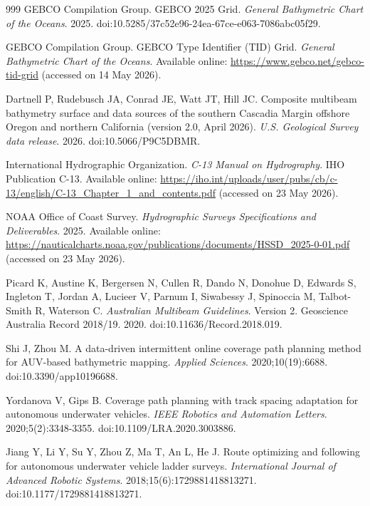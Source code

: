 \documentclass[jmse,article,submit,moreauthors]{Definitions/mdpi}
\begin{document}
\sloppy
\begin{thebibliography}{999}
GEBCO Compilation Group. GEBCO 2025 Grid. \textit{General Bathymetric Chart of the Oceans}. 2025. doi:10.5285/37c52e96-24ea-67ce-e063-7086abc05f29.

GEBCO Compilation Group. GEBCO Type Identifier (TID) Grid. \textit{General Bathymetric Chart of the Oceans}. Available online: \url{https://www.gebco.net/gebco-tid-grid} (accessed on 14 May 2026).

Dartnell P, Rudebusch JA, Conrad JE, Watt JT, Hill JC. Composite multibeam bathymetry surface and data sources of the southern Cascadia Margin offshore Oregon and northern California (version 2.0, April 2026). \textit{U.S. Geological Survey data release}. 2026. doi:10.5066/P9C5DBMR.

International Hydrographic Organization. \textit{C-13 Manual on Hydrography}. IHO Publication C-13. Available online: \url{https://iho.int/uploads/user/pubs/cb/c-13/english/C-13_Chapter_1_and_contents.pdf} (accessed on 23 May 2026).

NOAA Office of Coast Survey. \textit{Hydrographic Surveys Specifications and Deliverables}. 2025. Available online: \url{https://nauticalcharts.noaa.gov/publications/documents/HSSD_2025-0-01.pdf} (accessed on 23 May 2026).

Picard K, Austine K, Bergersen N, Cullen R, Dando N, Donohue D, Edwards S, Ingleton T, Jordan A, Lucieer V, Parnum I, Siwabessy J, Spinoccia M, Talbot-Smith R, Waterson C. \textit{Australian Multibeam Guidelines}. Version 2. Geoscience Australia Record 2018/19. 2020. doi:10.11636/Record.2018.019.

Shi J, Zhou M. A data-driven intermittent online coverage path planning method for AUV-based bathymetric mapping. \textit{Applied Sciences}. 2020;10(19):6688. doi:10.3390/app10196688.

Yordanova V, Gips B. Coverage path planning with track spacing adaptation for autonomous underwater vehicles. \textit{IEEE Robotics and Automation Letters}. 2020;5(2):3348-3355. doi:10.1109/LRA.2020.3003886.

Jiang Y, Li Y, Su Y, Zhou Z, Ma T, An L, He J. Route optimizing and following for autonomous underwater vehicle ladder surveys. \textit{International Journal of Advanced Robotic Systems}. 2018;15(6):1729881418813271. doi:10.1177/1729881418813271.


\end{thebibliography}
\end{document}
